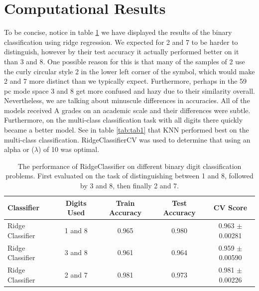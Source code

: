\documentclass[11pt]{amsart}
\begin{document}
\section{Computational Results}\label{sec:results}

To be concise, notice in table \ref{tab:tab0} we have displayed the results of the binary classification using ridge regression.
We expected for 2 and 7 to be harder to distinguish, however by their test accuracy it actually performed better on it than 3 and 8. 
One possible reason for this is that many of the samples of 2 use the curly circular style 2 in the lower left corner of the symbol, which would make 2 and 7 more distinct than we typically expect. 
Furthermore, perhaps in the 59 pc mode space 3 and 8 get more confused and hazy due to their similarity overall.
Nevertheless, we are talking about minuscule differences in accuracies.
All of the models received A grades on an academic scale and their differences were subtle.
Furthermore, on the multi-class classification task with all digits there quickly became a better model.
See in table \ref{tab:tab1} that KNN performed best on the multi-class classification.
RidgeClassifierCV was used to determine that using an alpha or ($\lambda$) of 10 was optimal.

\begin{table}[h]
    \centering
    \begin{tabular}{|l|c|c|c|c|} %
        \hline
        \textbf{Classifier} & \textbf{Digits Used} & \textbf{Train Accuracy} & \textbf{Test Accuracy} & \textbf{CV Score} \\ 
        \hline
        Ridge Classifier & 1 and 8 & 0.965  & 0.980 & 0.963 $\pm$ 0.00281 \\
        \hline
        Ridge Classifier & 3 and 8 & 0.961  & 0.964 & 0.959 $\pm$ 0.00590 \\
        \hline
        Ridge Classifier & 2 and 7 & 0.981  & 0.973 & 0.981 $\pm$ 0.00226 \\  
        \hline
    \end{tabular}
    \caption{The performance of RidgeClassifier on different binary digit classification problems. First evaluated on the task of distinguishing between 1 and 8, followed by 3 and 8, then finally 2 and 7.}
    \label{tab:tab0}
\end{table}
\end{document}
